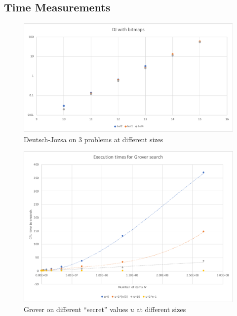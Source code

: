 \documentclass[sigplan,screen]{acmart}
\theoremstyle{definition}
\begin{document}
\subsection{Time Measurements}

\begin{figure}
 \includegraphics[scale=0.4]{../execution/RetroPE/DJ.pdf}
  \caption{\label{fig:DJ} Deutsch-Jozsa on $3$ problems at different sizes}
\end{figure}

\begin{figure}
\includegraphics[scale=0.4]{../execution/RetroPE/grover.pdf}
  \caption{\label{fig:GroverWC} Grover on different ``secret'' values $u$ at different sizes}
\end{figure}
\end{document}
